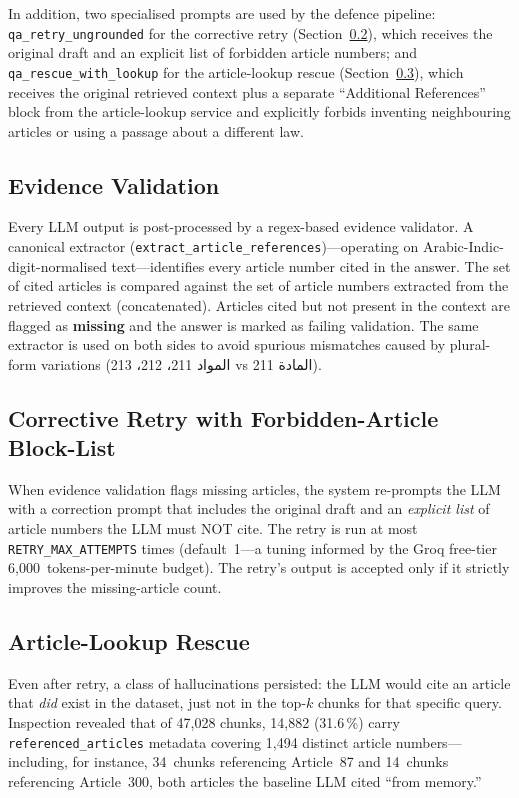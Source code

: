 \documentclass[final,1p,times]{elsarticle}
\newcommand{\ar}[1]{{\arabicfont\beginR #1\endR}}
\begin{document}
In addition, two specialised prompts are used by the defence pipeline:
\texttt{qa\_retry\_ungrounded} for the corrective retry
(Section~\ref{sec:retry}), which receives the original draft and an explicit
list of forbidden article numbers; and \texttt{qa\_rescue\_with\_lookup}
for the article-lookup rescue (Section~\ref{sec:rescue}), which receives
the original retrieved context plus a separate ``Additional References''
block from the article-lookup service and explicitly forbids inventing
neighbouring articles or using a passage about a different law.

\subsection{Evidence Validation}\label{sec:validate}

Every LLM output is post-processed by a regex-based evidence validator. A
canonical extractor (\texttt{extract\_article\_references})---operating on
Arabic-Indic-digit-normalised text---identifies every article number cited
in the answer. The set of cited articles is compared against the set of
article numbers extracted from the retrieved context (concatenated).
Articles cited but not present in the context are flagged as \textbf{missing}
and the answer is marked as failing validation. The same extractor is used
on both sides to avoid spurious mismatches caused by plural-form variations
(\ar{المواد 211، 212، 213} vs \ar{المادة 211}).

\subsection{Corrective Retry with Forbidden-Article Block-List}\label{sec:retry}

When evidence validation flags missing articles, the system re-prompts the
LLM with a correction prompt that includes the original draft and an
\emph{explicit list} of article numbers the LLM must NOT cite. The retry is
run at most \texttt{RETRY\_MAX\_ATTEMPTS} times (default~1---a tuning
informed by the Groq free-tier 6{,}000~tokens-per-minute budget). The
retry's output is accepted only if it strictly improves the missing-article
count.

\subsection{Article-Lookup Rescue}\label{sec:rescue}

Even after retry, a class of hallucinations persisted: the LLM would cite an
article that \emph{did} exist in the dataset, just not in the top-$k$ chunks
for that specific query. Inspection revealed that of 47{,}028 chunks,
14{,}882 (31.6\,\%) carry \texttt{referenced\_articles} metadata covering
1{,}494 distinct article numbers---including, for instance, 34~chunks
referencing Article~87 and 14~chunks referencing Article~300, both articles
the baseline LLM cited ``from memory.''
\end{document}
